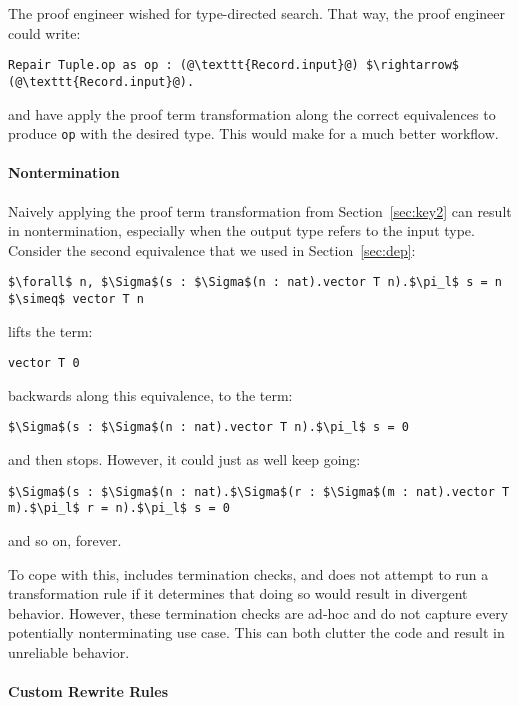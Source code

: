 The proof engineer wished for type-directed search.
That way, the proof engineer could write:

\begin{lstlisting}
Repair Tuple.op as op : (@\texttt{Record.input}@) $\rightarrow$ (@\texttt{Record.input}@).
\end{lstlisting}
and have \toolname apply the proof term transformation along the correct equivalences
to produce \lstinline{op} with the desired type.
This would make for a much better workflow.

\paragraph{Nontermination}

Naively applying the proof term transformation from Section~\ref{sec:key2} can result in nontermination,
especially when the output type refers to the input type.
Consider the second equivalence that we used in Section~\ref{sec:dep}: %

\begin{lstlisting}
$\forall$ n, $\Sigma$(s : $\Sigma$(n : nat).vector T n).$\pi_l$ s = n $\simeq$ vector T n
\end{lstlisting}
\toolname lifts the term:

\begin{lstlisting}
vector T 0
\end{lstlisting}
backwards along this equivalence, to the term:

\begin{lstlisting}
$\Sigma$(s : $\Sigma$(n : nat).vector T n).$\pi_l$ s = 0
\end{lstlisting}
and then stops.
However, it could just as well keep going:

\begin{lstlisting}
$\Sigma$(s : $\Sigma$(n : nat).$\Sigma$(r : $\Sigma$(m : nat).vector T m).$\pi_l$ r = n).$\pi_l$ s = 0
\end{lstlisting}
and so on, forever.

To cope with this, \toolname includes termination checks, and does not attempt to run a transformation rule
if it determines that doing so would result in divergent behavior.
However, these termination checks are ad-hoc and do not capture every potentially nonterminating use case.
This can both clutter the code and result in unreliable behavior.

\paragraph{Custom Rewrite Rules}

